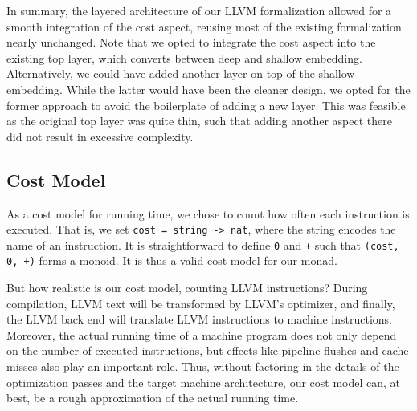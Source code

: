 \documentclass[acmsmall]{acmart}
\newcommand{\is}{\lstinline[language=isabelle]}
\begin{document}
In summary, the layered architecture of our LLVM formalization allowed for a smooth integration of the cost aspect, reusing most of the existing formalization nearly unchanged. 
Note that we opted to integrate the cost aspect into the existing top layer, which converts between deep and shallow embedding. Alternatively, we could have added another layer on top of the shallow embedding. While the latter would have been the cleaner design, we opted for the former approach to avoid the boilerplate of adding a new layer. This was feasible as the original top layer was quite thin, such that adding another aspect there did not result in excessive complexity.

\subsection{Cost Model}\label{sec:llvm-cost-model}
As a cost model for running time, we chose to count how often each instruction is executed. 
That is, we set \is{cost = string -> nat}, where the string encodes the name of an instruction. It is straightforward to define \is{0} and \is{+} such that \is{(cost, 0, +)} forms a 
monoid.
It is thus a valid cost model for our monad.

But how realistic is our cost model, counting LLVM instructions? 
During compilation, LLVM text will be transformed by LLVM's optimizer, and finally, the LLVM back end will translate LLVM
\clearpage
instructions to machine instructions.
Moreover, the actual running time of a machine program does not only depend on the number of executed instructions, 
but effects like pipeline flushes and cache misses also play an important role.
Thus, without factoring in the details of the optimization passes and the target machine architecture, 
our cost model can, at best, be a rough approximation of the actual running time.


\end{document}
